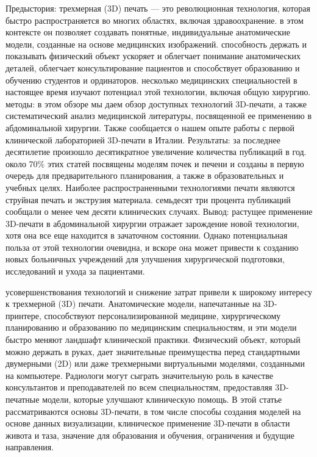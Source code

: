 Предыстория: трехмерная (3D) печать — это революционная технология, которая
быстро распространяется во многих областях, включая здравоохранение. в этом
контексте он позволяет создавать понятные, индивидуальные анатомические модели,
созданные на основе медицинских изображений. способность держать и показывать
физический объект ускоряет и облегчает понимание анатомических деталей,
облегчает консультирование пациентов и способствует образованию и обучению
студентов и ординаторов. несколько медицинских специальностей в настоящее время
изучают потенциал этой технологии, включая общую хирургию. методы: в этом обзоре
мы даем обзор доступных технологий 3D-печати, а также систематический анализ
медицинской литературы, посвященной ее применению в абдоминальной хирургии.
Также сообщается о нашем опыте работы с первой клинической лабораторией
3D-печати в Италии. Результаты: за последнее десятилетие произошло десятикратное
увеличение количества публикаций в год. около 70\% этих статей посвящены моделям
почек и печени и созданы в первую очередь для предварительного планирования, а
также в образовательных и учебных целях. Наиболее распространенными технологиями
печати являются струйная печать и экструзия материала. семьдесят три процента
публикаций сообщали о менее чем десяти клинических случаях. Вывод: растущее
применение 3D-печати в абдоминальной хирургии отражает зарождение новой
технологии, хотя она все еще находится в зачаточном состоянии. Однако
потенциальная польза от этой технологии очевидна, и вскоре она может привести к
созданию новых больничных учреждений для улучшения хирургической подготовки,
исследований и ухода за пациентами.\cite{pietrabissa2020}

усовершенствования технологий и снижение затрат привели к широкому интересу к
трехмерной (3D) печати. Анатомические модели, напечатанные на 3D-принтере,
способствуют персонализированной медицине, хирургическому планированию и
образованию по медицинским специальностям, и эти модели быстро меняют ландшафт
клинической практики. Физический объект, который можно держать в руках, дает
значительные преимущества перед стандартными двумерными (2D) или даже
трехмерными виртуальными моделями, созданными на компьютере. Радиологи могут
сыграть значительную роль в качестве консультантов и преподавателей по всем
специальностям, предоставляя 3D-печатные модели, которые улучшают клиническую
помощь. В этой статье рассматриваются основы 3D-печати, в том числе способы
создания моделей на основе данных визуализации, клиническое применение 3D-печати
в области живота и таза, значение для образования и обучения, ограничения и
будущие направления.\cite{bastawrous2018}

